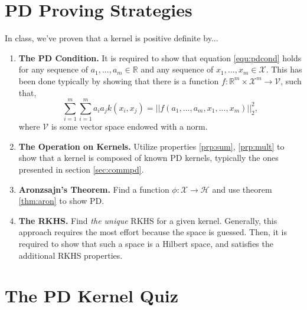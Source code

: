 \documentclass{article}[12pt]
\begin{document}
\section{PD Proving Strategies}

In class, we've proven that a kernel is positive definite by...
\begin{enumerate}
\item \textbf{The PD Condition.} It is required to show that equation \ref{equ:pdcond} holds for any sequence of $a_1, ..., a_m \in \mathbb R$ and any sequence of $x_1, ..., x_m \in \mathcal X$. This has been done typically by showing that there is a function $f : \mathbb R^m \times \mathcal X ^ m \rightarrow \mathcal V$, such that,
\begin{equation}
\sum_{i=1}^{m} \sum_{i=1}^{m} a_{i} a_{j} k\left(x_{i}, x_{j}\right) = \left| \left| f \left(a_1, ..., a_m, x_1, ..., x_m \right) \right| \right|_2^2 ,
\end{equation}
where $\mathcal V$ is some vector space endowed with a norm.
\item \textbf{The Operation on Kernels.} Utilize properties \ref{prp:sum}, \ref{prp:mult} to show that a kernel is composed of known PD kernels, typically the ones presented in section \ref{sec:commpd}.
\item \textbf{Aronzsajn's Theorem.} Find a function $\phi: \mathcal{X} \rightarrow \mathcal{H}$ and use theorem \ref{thm:aron} to show PD.
\item \textbf{The RKHS.} Find \textit{the unique} RKHS for a given kernel. Generally, this approach requires the most effort because the space is guessed. Then, it is required to show that such a space is a Hilbert space, and satisfies the additional RKHS properties.
\end{enumerate}

\section{The PD Kernel Quiz}
\end{document}
